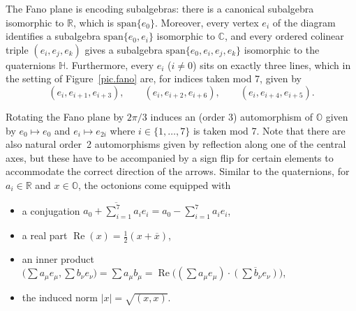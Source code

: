 \documentclass[pdftex]{sigma}
\numberwithin{equation}{section}
\newcommand{\Oct}{{\mathbb O}}
\begin{document}
The Fano plane is encoding subalgebras: there is a canonical subalgebra isomorphic to $\mathbb{R}$, which is $\mathrm{span}\{e_0\}$. Moreover, every vertex $e_i$ of the diagram identifies a subalgebra $\mathrm{span}\{e_0,e_i\}$ isomorphic to $\mathbb{C}$, and every ordered colinear triple $(e_i, e_j, e_k)$ gives a subalgebra $\mathrm{span}\{e_0,e_i, e_j, e_k\}\!$ isomorphic to the quaternions $\mathbb{H}$. Furthermore, every $e_i$ ($i \neq 0$) sits on exactly three lines, which in the setting of Figure~\ref{pic.fano} are, for indices taken mod 7, given by \begin{equation} \label{eq:QuatEmbedding}
(e_i, e_{i+1}, e_{i+3} ), \qquad (e_i, e_{i+2}, e_{i+6}), \qquad (e_i, e_{i+4}, e_{i+5}).
\end{equation}

Rotating the Fano plane by $2\pi/3$ induces an (order 3) automorphism of $\Oct$ given by $e_0 \mapsto e_0$ and $e_i \mapsto e_{2i}$ where $i \in \{1 , \dots , 7\}$ is taken mod 7. Note that there are also natural order~2 automorphisms given by reflection along one of the central axes, but these have to be accompanied by a sign flip for certain elements to accommodate the correct direction of the arrows.
Similar to the quaternions, for $a_i \in \mathbb{R}$ and $x \in \Oct$, the octonions come equipped with
\begin{itemize}\itemsep=0pt
\item a conjugation $\overline{a_0 + \sum_{i=1}^7 a_i e_i} = a_0 - \sum_{i=1}^7 a_i e_i$,
\item a real part $\operatorname{Re}(x) =\frac{1}{2} (x + \overline{x})$,
\item an inner product $\big(\sum a_\mu e_\mu , \sum b_\nu e_\nu \big) = \sum a_\mu b_\mu = \operatorname{Re}\big((\sum a_\mu e_\mu) \cdot \overline{(\sum b_\nu e_\nu)}\big)$,
\item the induced norm $| x | = \sqrt{(x,x)}$.
\end{itemize}
\end{document}
